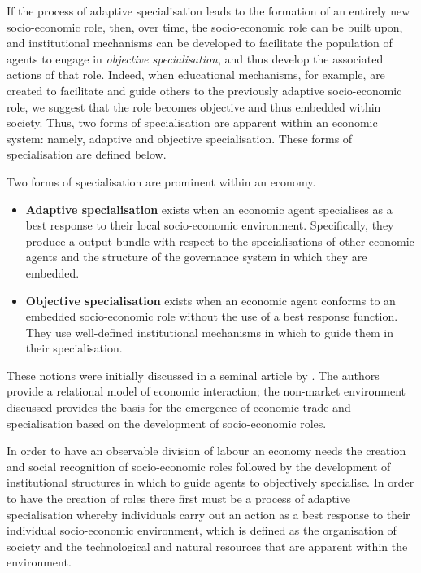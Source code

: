 If the process of adaptive specialisation leads to the formation of an entirely new socio-economic role, then, over time, the socio-economic role can be built upon, and institutional mechanisms can be developed to facilitate the population of agents to engage in \emph{objective specialisation}, and thus develop the associated actions of that role. Indeed, when educational mechanisms, for example, are created to facilitate and guide others to the previously adaptive socio-economic role, we suggest that the role becomes objective and thus embedded within society. Thus, two forms of specialisation are apparent within an economic system: namely, adaptive and objective specialisation. These forms of specialisation are defined below.
\begin{definition} \label{formsofspec}
Two forms of specialisation are prominent within an economy.
\begin{itemize}
\item \textbf{Adaptive specialisation} exists when an economic agent specialises as a best response to their local socio-economic environment. Specifically, they produce a output bundle with respect to the specialisations of other economic agents and the structure of the governance system in which they are embedded.

\item \textbf{Objective specialisation} exists when an economic agent conforms to an embedded socio-economic role without the use of a best response function. They use well-defined institutional mechanisms in which to guide them in their specialisation.
\end{itemize}
\end{definition}
These notions were initially discussed in a seminal article by \citet{GillesLazarovaRuys2007}. The authors provide a relational model of economic interaction; the non-market environment discussed provides the basis for the emergence of economic trade and specialisation based on the development of socio-economic roles.

In order to have an observable division of labour an economy needs the creation and social recognition of socio-economic roles followed by the development of institutional structures in which to guide agents to objectively specialise. In order to have the creation of roles there first must be a process of adaptive specialisation whereby individuals carry out an action as a best response to their individual socio-economic environment, which is defined as the organisation of society and the technological and natural resources that are apparent within the environment. 

